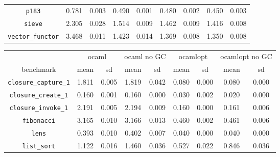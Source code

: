 \documentclass[12pt,a4paper,twoside,openright]{report}
\begin{document}
\begin{figure}[h]
\begin{tabular}{| c | c c | c c | c c | c c |}
\lstinline!p183!              & \cellcolor[hsb]{0.0,0.377,1}0.781 & 0.003 & \cellcolor[hsb]{0.0,0.051,1}0.490 & 0.001 & \cellcolor[hsb]{0.0,0.040,1}0.480 & 0.002 & \cellcolor[hsb]{0.0,0.006,1}0.450 & 0.003 \\
\lstinline!sieve!             & \cellcolor[hsb]{0.3,0.166,1}2.305 & 0.028 & \cellcolor[hsb]{0.3,0.452,1}1.514 & 0.009 & \cellcolor[hsb]{0.3,0.471,1}1.462 & 0.009 & \cellcolor[hsb]{0.3,0.487,1}1.416 & 0.008 \\
\lstinline!vector_functor!    & \cellcolor[hsb]{0.3,0.422,1}3.468 & 0.011 & \cellcolor[hsb]{0.3,0.763,1}1.423 & 0.014 & \cellcolor[hsb]{0.3,0.772,1}1.369 & 0.008 & \cellcolor[hsb]{0.3,0.775,1}1.350 & 0.008 \\
\hline
\end{tabular}

\begin{tabular}{| c | c c | c c | c c | c c |}
  \hline
  & \multicolumn{2}{c|}{ocaml}
  & \multicolumn{2}{c|}{ocaml no GC}
  & \multicolumn{2}{c|}{ocamlopt}
  & \multicolumn{2}{c|}{ocamlopt no GC}
  \\
benchmark                     & mean  & sd    & mean  & sd    & mean  & sd    & mean  & sd \\
  \hline
\lstinline!closure_capture_1! & \cellcolor[hsb]{0.3,0.000,1}1.811 & 0.005 & \cellcolor[hsb]{0.0,0.002,1}1.819 & 0.042 & \cellcolor[hsb]{0.3,0.956,1}0.080 & 0.000 & \cellcolor[hsb]{0.3,0.956,1}0.080 & 0.000 \\
\lstinline!closure_create_1!  & \cellcolor[hsb]{0.3,0.000,1}0.160 & 0.001 & \cellcolor[hsb]{0.3,0.001,1}0.160 & 0.000 & \cellcolor[hsb]{0.3,0.810,1}0.030 & 0.002 & \cellcolor[hsb]{0.3,0.875,1}0.020 & 0.000 \\
\lstinline!closure_invoke_1!  & \cellcolor[hsb]{0.3,0.000,1}2.191 & 0.005 & \cellcolor[hsb]{0.0,0.000,1}2.194 & 0.009 & \cellcolor[hsb]{0.3,0.927,1}0.160 & 0.000 & \cellcolor[hsb]{0.3,0.927,1}0.161 & 0.006 \\
\lstinline!fibonacci!         & \cellcolor[hsb]{0.3,0.000,1}3.165 & 0.010 & \cellcolor[hsb]{0.3,0.000,1}3.166 & 0.013 & \cellcolor[hsb]{0.3,0.855,1}0.460 & 0.002 & \cellcolor[hsb]{0.3,0.854,1}0.461 & 0.006 \\
\lstinline!lens!              & \cellcolor[hsb]{0.3,0.000,1}0.393 & 0.010 & \cellcolor[hsb]{0.0,0.012,1}0.402 & 0.007 & \cellcolor[hsb]{0.3,0.898,1}0.040 & 0.000 & \cellcolor[hsb]{0.3,0.898,1}0.040 & 0.000 \\
\lstinline!list_sort!         & \cellcolor[hsb]{0.3,0.000,1}1.122 & 0.016 & \cellcolor[hsb]{0.0,0.151,1}1.460 & 0.036 & \cellcolor[hsb]{0.3,0.530,1}0.527 & 0.022 & \cellcolor[hsb]{0.3,0.246,1}0.846 & 0.036 \\

\end{tabular}
\end{figure}
\end{document}
